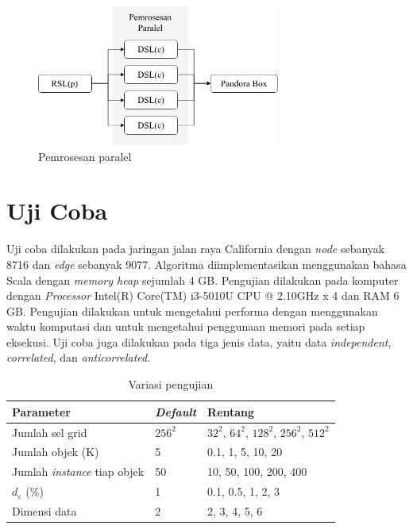 \documentclass[conference]{IEEEtran}
\begin{document}
\begin{figure}[htbp]
	\centering
	\includegraphics[width=8cm]{img/bab3/paralel.png}
	\caption{Pemrosesan paralel}
	\label{fig:paralel}
\end{figure}

\section{Uji Coba}
Uji coba dilakukan pada jaringan jalan raya California\cite{ontrip} dengan \textit{node} sebanyak 8716 dan \textit{edge} sebanyak 9077. Algoritma diimplementasikan menggunakan bahasa Scala dengan \textit{memory heap} sejumlah 4 GB. Pengujian dilakukan pada komputer dengan \textit{Processor} Intel(R) Core(TM) i3-5010U CPU @ 2.10GHz x 4 dan RAM 6 GB. Pengujian dilakukan untuk mengetahui performa dengan menggunakan waktu komputasi dan untuk mengetahui penggunaan memori pada setiap eksekusi. Uji coba juga dilakukan pada tiga jenis data, yaitu data \textit{independent}, \textit{correlated}, dan \textit{anticorrelated}.

\begin{table}[htbp]
	\caption{Variasi pengujian}
	\begin{center}
		\begin{tabular}{| l | l | l |}
			\hline
			\textbf{Parameter} & \textbf{\textit{Default}} & \textbf {Rentang} \\ \hline
			Jumlah sel grid & $ 256^2 $ & $ 32^2 $, $ 64^2 $, $ 128^2 $, $ 256^2 $, $ 512^2 $ \\ \hline
			Jumlah objek (K) & 5 & 0.1, 1, 5, 10, 20 \\ \hline
			Jumlah \textit{instance} tiap objek & 50 & 10, 50, 100, 200, 400 \\ \hline
			$ d_\varepsilon $ (\%) & 1 & 0.1, 0.5, 1, 2, 3 \\ \hline
			Dimensi data & 2 & 2, 3, 4, 5, 6 \\ \hline
		\end{tabular}
		\label{tab:uji}
	\end{center}
\end{table}
\end{document}
